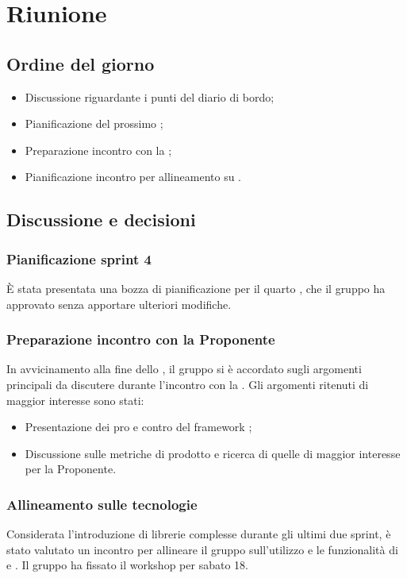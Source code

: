 \section{Riunione}
\subsection{Ordine del giorno}
\begin{itemize}
	\item Discussione riguardante i punti del diario di bordo;
	\item Pianificazione del prossimo ;
	\item Preparazione incontro con la ;
	\item Pianificazione incontro per allineamento su .
\end{itemize}

\subsection{Discussione e decisioni}
\subsubsection{Pianificazione sprint 4}
\par È stata presentata una bozza di pianificazione per il quarto , che il gruppo ha approvato senza apportare ulteriori modifiche.

\subsubsection{Preparazione incontro con la Proponente}
\par In avvicinamento alla fine dello , il gruppo si è accordato sugli argomenti principali da discutere durante l'incontro con la . Gli argomenti ritenuti di maggior interesse sono stati:
\begin{itemize}
	\item Presentazione dei pro e contro del framework ;
	\item Discussione sulle metriche di prodotto e ricerca di quelle di maggior interesse per la Proponente.
\end{itemize}

\subsubsection{Allineamento sulle tecnologie}
\par Considerata l'introduzione di librerie complesse durante gli ultimi due sprint, è stato valutato un incontro per allineare il gruppo sull'utilizzo e le funzionalità di  e . Il gruppo ha fissato il workshop per sabato 18.

